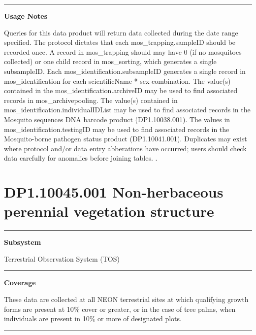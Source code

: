 \documentclass[]{article}
\begin{document}
\begin{center}\rule{0.5\linewidth}{\linethickness}\end{center}

\textbf{Usage Notes}

Queries for this data product will return data collected during the date
range specified. The protocol dictates that each mos\_trapping.sampleID
should be recorded once. A record in mos\_trapping should may have 0 (if
no mosquitoes collected) or one child record in mos\_sorting, which
generates a single subsampleID. Each mos\_identification.subsampleID
generates a single record in mos\_identification for each scientificName
* sex combination. The value(s) contained in the
mos\_identification.archiveID may be used to find associated records in
mos\_archivepooling. The value(s) contained in
mos\_identification.individualIDList may be used to find associated
records in the Mosquito sequences DNA barcode product (DP1.10038.001).
The values in mos\_identification.testingID may be used to find
associated records in the Mosquito-borne pathogen status product
(DP1.10041.001). Duplicates may exist where protocol and/or data entry
abberations have occurred; users should check data carefully for
anomalies before joining tables. \newpage
.

\section{DP1.10045.001 Non-herbaceous perennial vegetation
structure}\label{dp1.10045.001-non-herbaceous-perennial-vegetation-structure}

\begin{center}\rule{0.5\linewidth}{\linethickness}\end{center}

\textbf{Subsystem}

Terrestrial Observation System (TOS)

\begin{center}\rule{0.5\linewidth}{\linethickness}\end{center}

\textbf{Coverage}

These data are collected at all NEON terrestrial sites at which
qualifying growth forms are present at 10\% cover or greater, or in the
case of tree palms, when individuals are present in 10\% or more of
designated plots.

\begin{center}\rule{0.5\linewidth}{\linethickness}\end{center}
\end{document}
